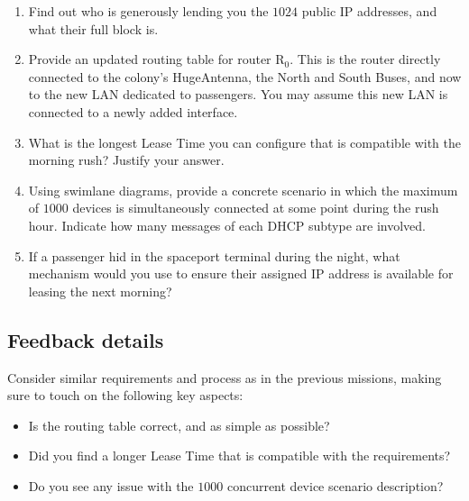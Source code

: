 \begin{enumerate}[itemsep=0.1cm]
\item Find out who is generously lending you the $1024$ public IP addresses, and what their full block is.

\item Provide an updated routing table for router $\textrm{R}_0$. This is the router directly connected to the colony's \mbox{HugeAntenna\texttrademark}, the North and South Buses, and now to the new LAN dedicated to passengers. You may assume this new LAN is connected to a newly added interface.

\item What is the longest Lease Time you can configure that is compatible with the morning rush? Justify your answer.

\item Using swimlane diagrams, provide a concrete scenario in which the maximum of $1000$ devices is simultaneously connected at some point during the rush hour. Indicate how many messages of each DHCP subtype are involved.

\item If a passenger hid in the spaceport terminal during the night, what mechanism would you use to ensure their assigned IP address is available for leasing the next morning?

\end{enumerate}


\subsection*{Feedback details}

Consider similar requirements and process as in the previous missions, making sure to touch on the following key aspects:
\begin{itemize}
\item Is the routing table correct, and as simple as possible?
\item Did you find a longer Lease Time that is compatible with the requirements?
\item Do you see any issue with the $1000$ concurrent device scenario description?
\end{itemize}
